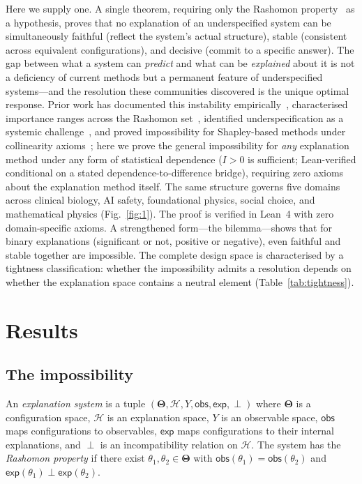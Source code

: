 \documentclass[11pt]{article}
\newcommand{\Params}{\mathbf{\Theta}}
\newcommand{\sH}{\mathcal{H}}
\newcommand{\incomp}{\perp}
\begin{document}
Here we supply one.  A single theorem, requiring only the Rashomon
property~\citep{breiman2001statistical} as a hypothesis, proves that no
explanation of an underspecified system can be simultaneously faithful
(reflect the system's actual structure), stable (consistent across
equivalent configurations), and decisive (commit to a specific answer).
The gap between what a system can \emph{predict} and what can be
\emph{explained} about it is not a deficiency of current methods but a
permanent feature of underspecified systems---and the resolution these
communities discovered is the unique optimal response.  Prior work has
documented this instability
empirically~\citep{krishna2022disagreement}, characterised importance
ranges across the Rashomon set~\citep{fisher2019models}, identified
underspecification as a systemic
challenge~\citep{damour2022underspecification}, and proved impossibility for Shapley-based methods under collinearity
axioms~\citep{bilodeau2024impossibility}; here we prove the general
impossibility for \emph{any} explanation method under any form of
statistical dependence ($I > 0$ is sufficient; Lean-verified conditional on a stated dependence-to-difference bridge),
requiring zero axioms about the explanation method itself.  The same
structure governs five domains across clinical biology, AI safety,
foundational physics, social choice, and mathematical physics
(Fig.~\ref{fig:1}).  The proof is verified in Lean~4 with zero
domain-specific axioms.  A strengthened form---the bilemma---shows that
for binary explanations (significant or not, positive or negative), even
faithful and stable together are impossible.  The complete design space
is characterised by a tightness classification: whether the impossibility
admits a resolution depends on whether the explanation space contains a
neutral element (Table~\ref{tab:tightness}).


\section*{Results}

\subsection*{The impossibility}

An \emph{explanation system} is a tuple $(\Params, \sH, Y, \mathsf{obs},
\mathsf{exp}, \incomp)$ where $\Params$ is a configuration space, $\sH$
is an explanation space, $Y$ is an observable space, $\mathsf{obs}$
maps configurations to observables, $\mathsf{exp}$ maps configurations
to their internal explanations, and $\incomp$ is an incompatibility
relation on $\sH$.  The system has the \emph{Rashomon property} if
there exist $\theta_1, \theta_2 \in \Params$ with $\mathsf{obs}(\theta_1) =
\mathsf{obs}(\theta_2)$ and $\mathsf{exp}(\theta_1) \incomp
\mathsf{exp}(\theta_2)$.
\end{document}
